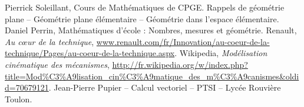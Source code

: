 \documentclass[10pt,oneside]{article}
\begin{document}
\begin{thebibliography}{2}
 Pierrick Soleillant, Cours de Mathématiques de CPGE. Rappels de géométrie plane -- Géométrie plane élémentaire -- Géométrie dans l'espace élémentaire.
 Daniel Perrin, Mathématiques d'école : Nombres, mesures et géométrie.
 Renault, \textit{Au c\oe{}ur de la technique}, \url{www.renault.com/fr/Innovation/au-coeur-de-la-technique/Pages/au-coeur-de-la-technique.aspx}.
 Wikipedia, \textit{Modélisation cinématique des mécanismes}, \url{http://fr.wikipedia.org/w/index.php?title=Mod\%C3\%A9lisation_cin\%C3\%A9matique_des_m\%C3\%A9canismes\&oldid=70679121}.
 Jean-Pierre Pupier -- Calcul vectoriel -- PTSI -- Lycée Rouvière Toulon.
\end{thebibliography}
\end{document}
